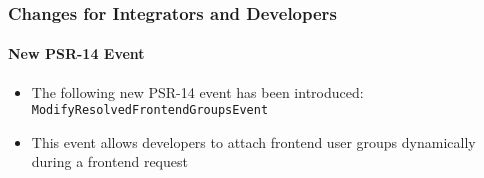 %

\begin{frame}[fragile]
	\frametitle{Changes for Integrators and Developers}
	\framesubtitle{New PSR-14 Event}

	\begin{itemize}
		\item The following new PSR-14 event has been introduced:\newline
			\small\texttt{ModifyResolvedFrontendGroupsEvent}\normalsize
		\item This event allows developers to attach frontend user groups
			dynamically during a frontend request
	\end{itemize}

\end{frame}

